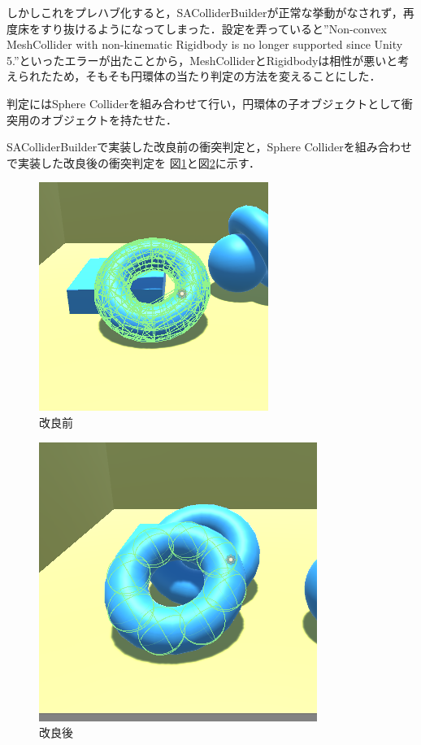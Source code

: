 \documentclass[12pt]{jarticle}
\begin{document}
しかしこれをプレハブ化すると，SAColliderBuilderが正常な挙動がなされず，再度床をすり抜けるようになってしまった．設定を弄っていると''Non-convex MeshCollider with non-kinematic Rigidbody is no longer supported since Unity 5.''といったエラーが出たことから，MeshColliderとRigidbodyは相性が悪いと考えられたため，そもそも円環体の当たり判定の方法を変えることにした．

判定にはSphere Colliderを組み合わせて行い，円環体の子オブジェクトとして衝突用のオブジェクトを持たせた．

SAColliderBuilderで実装した改良前の衝突判定と，Sphere Colliderを組み合わせで実装した改良後の衝突判定を
図\ref{fig:bwp1}と図\ref{fig:bwp2}に示す．

\begin{figure}[!hbt]
  	\begin{center}
  		\includegraphics[scale=0.55]{images/bwp1.png}
	\end{center}
  	\caption{改良前}
  	\label{fig:bwp1}
\end{figure}

\begin{figure}[!hbt]
  	\begin{center}
  		\includegraphics[scale=0.5]{images/bwp2.png}
	\end{center}
  	\caption{改良後}
  	\label{fig:bwp2}
\end{figure}
\end{document}
